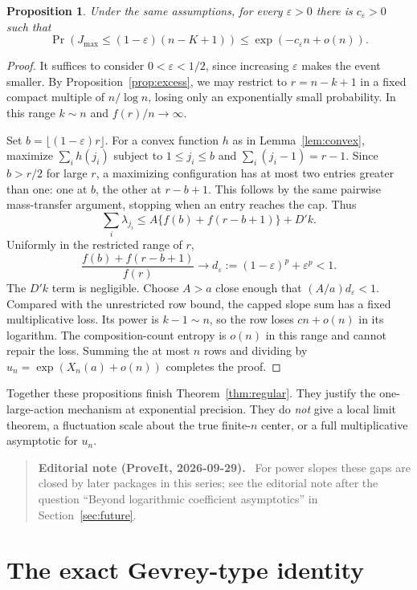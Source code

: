 \documentclass[11pt,a4paper]{article}
\numberwithin{equation}{section}
\newtheorem{proposition}[theorem]{Proposition}
\theoremstyle{definition}
\theoremstyle{remark}
\newenvironment{ednote}{\par\smallskip\begin{quote}\small\raggedright\textbf{Editorial note (ProveIt, 2026-09-29).}\ }{\end{quote}\smallskip}
\begin{document}
\begin{proposition}
\label{prop:giant}
Under the same assumptions, for every $\varepsilon>0$ there is
$c_\varepsilon>0$ such that
\[
 \Pr\!\left(J_{\max}\le(1-\varepsilon)(n-K+1)\right)
 \le\exp(-c_\varepsilon n+o(n)).
\]
\end{proposition}

\begin{proof}
It suffices to consider $0<\varepsilon<1/2$, since increasing
$\varepsilon$ makes the event smaller.  By Proposition~\ref{prop:excess},
we may restrict to
$r=n-k+1$ in a fixed compact multiple of $n/\log n$, losing only an
exponentially small probability.  In this range $k\sim n$ and
$f(r)/n\to\infty$.

Set $b=\lfloor(1-\varepsilon)r\rfloor$.  For a convex function $h$ as in
Lemma~\ref{lem:convex}, maximize $\sum_i h(j_i)$ subject to
$1\le j_i\le b$ and $\sum_i(j_i-1)=r-1$.  Since $b>r/2$ for large $r$,
a maximizing configuration has at most two entries greater than one:
one at $b$, the other at $r-b+1$.  This follows by the same pairwise
mass-transfer argument, stopping when an entry reaches the cap.  Thus
\[
 \sum_i\lambda_{j_i}
 \le A\{f(b)+f(r-b+1)\}+D'k.
\]
Uniformly in the restricted range of $r$,
\[
 \frac{f(b)+f(r-b+1)}{f(r)}
 \longrightarrow d_\varepsilon
 :=(1-\varepsilon)^p+\varepsilon^p<1.
\]
The $D'k$ term is negligible.  Choose $A>a$ close enough that
$(A/a)d_\varepsilon<1$.  Compared with the unrestricted row bound, the
capped slope sum has a fixed multiplicative loss.  Its power is $k-1\sim n$,
so the row loses $c n+o(n)$ in its logarithm.  The composition-count entropy
is $o(n)$ in this range and cannot repair the loss.  Summing the at most
$n$ rows and dividing by $u_n=\exp(X_n(a)+o(n))$ completes the proof.
\end{proof}

Together these propositions finish Theorem~\ref{thm:regular}.  They justify
the one-large-action mechanism at exponential precision.  They do
\emph{not} give a local limit theorem, a fluctuation scale about the true
finite-$n$ center, or a full multiplicative asymptotic for $u_n$.
\begin{ednote}
For power slopes these gaps are closed by later packages in this series;
see the editorial note after the question ``Beyond logarithmic coefficient
asymptotics'' in Section~\ref{sec:future}.
\end{ednote}

\section{The exact Gevrey-type identity}
\label{sec:gevrey}
\end{document}
